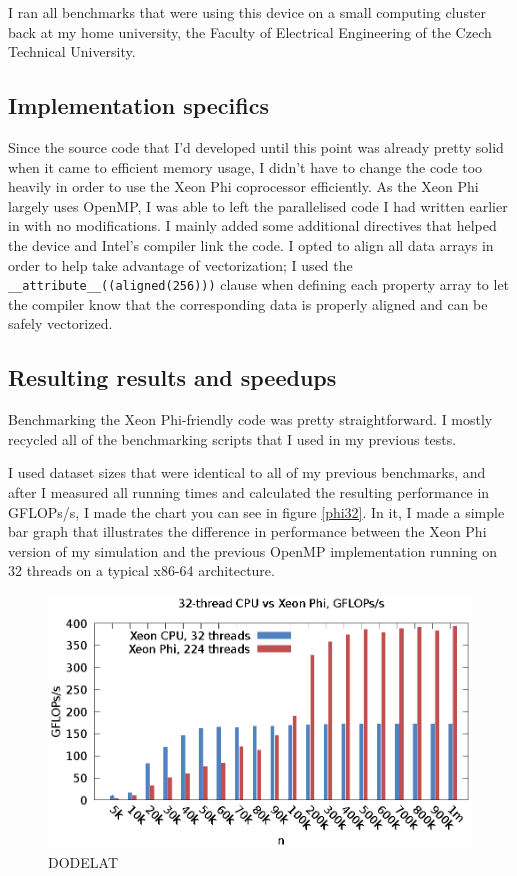 \documentclass[journal]{IEEEtran}
\begin{document}
		I ran all benchmarks that were using this device on a small computing cluster back at my home university, the Faculty of Electrical Engineering of the Czech Technical University.
		
		\subsection*{Implementation specifics}
		
			Since the source code that I'd developed until this point was already pretty solid when it came to efficient memory usage, I didn't have to change the code too heavily in order to use the Xeon Phi coprocessor efficiently. As the Xeon Phi largely uses OpenMP, I was able to left the parallelised code I had written earlier in with no modifications. I mainly added some additional directives that helped the device and Intel's compiler link the code. I opted to align all data arrays in order to help take advantage of vectorization; I used the \texttt{\_\_attribute\_\_((aligned(256)))} clause when defining each property array to let the compiler know that the corresponding data is properly aligned and can be safely vectorized.
			
		\subsection*{Resulting results and speedups}
		
			Benchmarking the Xeon Phi-friendly code was pretty straightforward. I mostly recycled all of the benchmarking scripts that I used in my previous tests. 
			
			I used dataset sizes that were identical to all of my previous benchmarks, and after I measured all running times and calculated the resulting performance in GFLOPs/s, I made the chart you can see in figure \ref{phi32}. In it, I made a simple bar graph that illustrates the difference in performance between the Xeon Phi version of my simulation and the previous OpenMP implementation running on 32 threads on a typical x86-64 architecture.
			
			\begin{figure}[ht]			
				\centering
				\includegraphics[width=.5\textwidth]{gnuplot/phi_vs_32.eps}
				\caption{\label{32_vs_phi} DODELAT} %
			\end{figure} 
			
\end{document}

